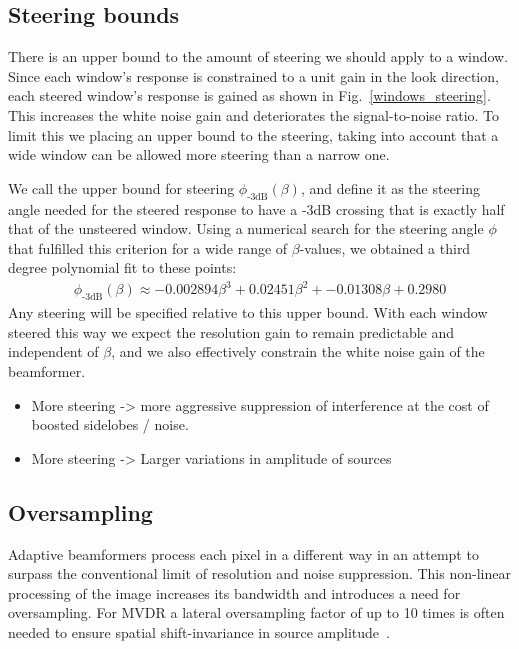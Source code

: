 \documentclass[10pt,journal,draftclsnofoot,onecolumn]{IEEEtran}
\newcommand\Fig[1]{Fig.~\ref{#1}}
\newcommand\1{\vec 1}
\begin{document}
\subsection{Steering bounds}

There is an upper bound to the amount of steering we should apply to a window. Since each window's response is constrained to a unit gain in the look direction, each steered window's response is gained as shown in \Fig{windows_steering}. This increases the white noise gain and deteriorates the signal-to-noise ratio. To limit this we placing an upper bound to the steering, taking into account that a wide window can be allowed more steering than a narrow one.

We call the upper bound for steering $\phi_{\text{-3dB}}(\beta)$, and define it as the steering angle needed for the steered response to have a -3dB crossing that is exactly half that of the unsteered window. Using a numerical search for the steering angle $\phi$ that fulfilled this criterion for a wide range of $\beta$-values, we obtained a third degree polynomial fit to these points:
%
\begin{align}
\phi_\text{-3dB}(\beta) \approx -0.002894\beta^3 + 0.02451\beta^2 + -0.01308\beta + 0.2980
\end{align}
%
Any steering will be specified relative to this upper bound. With each window steered this way we expect the resolution gain to remain predictable and independent of $\beta$, and we also effectively constrain the white noise gain of the beamformer.

\begin{itemize}
\item More steering -> more aggressive suppression of interference at the cost of boosted sidelobes / noise.
\item More steering -> Larger variations in amplitude of sources
\end{itemize}


\subsection{Oversampling}

Adaptive beamformers process each pixel in a different way in an attempt to surpass the conventional limit of resolution and noise suppression. This non-linear processing of the image increases its bandwidth and introduces a need for oversampling. For MVDR a lateral oversampling factor of up to 10 times is often needed to ensure spatial shift-invariance in source amplitude~\cite{Asen2014}.
\end{document}
